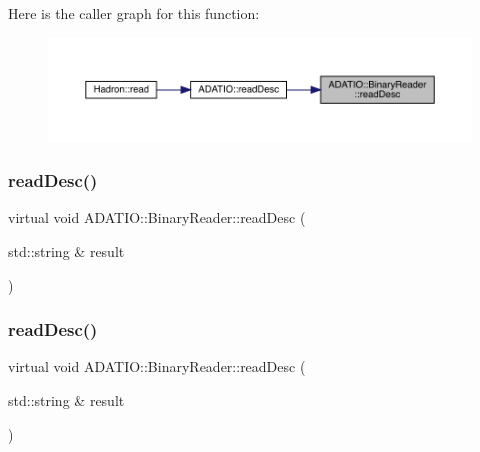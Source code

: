 Here is the caller graph for this function\+:
\nopagebreak
\begin{figure}[H]
\begin{center}
\leavevmode
\includegraphics[width=350pt]{da/dd9/classADATIO_1_1BinaryReader_a70de2f31f59d9846f4ee688c3590bf31_icgraph}
\end{center}
\end{figure}
\mbox{\label{classADATIO_1_1BinaryReader_a70de2f31f59d9846f4ee688c3590bf31}} 
\subsubsection{\texorpdfstring{readDesc()}{readDesc()}\hspace{0.1cm}{\footnotesize\ttfamily [2/3]}}
{\footnotesize\ttfamily virtual void A\+D\+A\+T\+I\+O\+::\+Binary\+Reader\+::read\+Desc (\begin{DoxyParamCaption}\item[{std\+::string \&}]{result }\end{DoxyParamCaption})\hspace{0.3cm}{\ttfamily [virtual]}}

\mbox{\label{classADATIO_1_1BinaryReader_a70de2f31f59d9846f4ee688c3590bf31}} 
\subsubsection{\texorpdfstring{readDesc()}{readDesc()}\hspace{0.1cm}{\footnotesize\ttfamily [3/3]}}
{\footnotesize\ttfamily virtual void A\+D\+A\+T\+I\+O\+::\+Binary\+Reader\+::read\+Desc (\begin{DoxyParamCaption}\item[{std\+::string \&}]{result }\end{DoxyParamCaption})\hspace{0.3cm}{\ttfamily [virtual]}}

